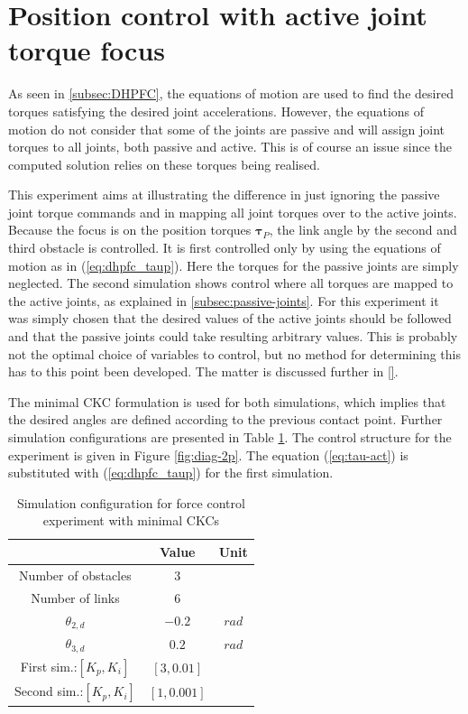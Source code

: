 \section{Position control with active joint torque focus}\label{sec:pas-pos}

As seen in \ref{subsec:DHPFC}, the equations of motion are used to find the desired torques satisfying the desired joint accelerations. However, the equations of motion do not consider that some of the joints are passive and will assign joint torques to all joints, both passive and active. This is of course an issue since the computed solution relies on these torques being realised.

This experiment aims at illustrating the difference in just ignoring the passive joint torque commands and in mapping all joint torques over to the active joints. Because the focus is on the position torques $\boldsymbol{\tau}_P$, the link angle by the second and third obstacle is controlled. It is first controlled only by using the equations of motion as in (\ref{eq:dhpfc_taup}). Here the torques for the passive joints are simply neglected. The second simulation shows control where all torques are mapped to the active joints, as explained in \ref{subsec:passive-joints}. For this experiment it was simply chosen that the desired values of the active joints should be followed and that the passive joints could take resulting arbitrary values. This is probably not the optimal choice of variables to control, but no method for determining this has to this point been developed. The matter is discussed further in \ref{}.

The minimal CKC formulation is used for both simulations, which implies that the desired angles are defined according to the previous contact point. Further simulation configurations are presented in Table \ref{tab:exp_2xp}. The control structure for the experiment is given in Figure \ref{fig:diag-2p}. The equation (\ref{eq:tau-act}) is substituted with (\ref{eq:dhpfc_taup}) for the first simulation.

\begin{table}[]
    \centering
    \begin{tabular}{|c|c|c|}
        \hline
        & Value & Unit\\
        \hline
        Number of obstacles & $3$ & \\
        Number of links & $6$ & \\
        $\theta_{2,d}$ & $-0.2$ & $rad$ \\
        $\theta_{3,d}$ & $0.2$ & $rad$ \\
        First sim.:$[K_{p}, K_{i}]$ & $[3, 0.01]$ &\\
        Second sim.:$[K_{p}, K_{i}]$ & $[1, 0.001]$ &\\
        \hline
    \end{tabular}
    \caption{Simulation configuration for force control experiment with minimal CKCs}
    \label{tab:exp_2xp}
\end{table}

